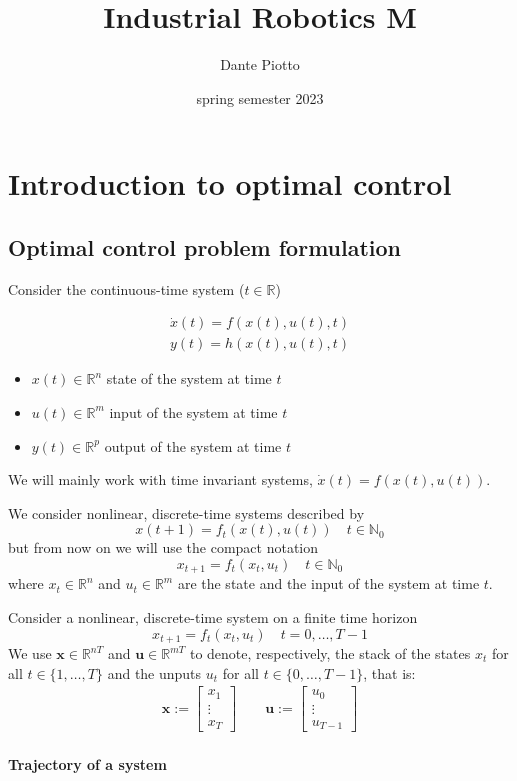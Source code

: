 \documentclass{book}
\title{Industrial Robotics M}
\author{Dante Piotto}
\date{spring semester 2023}
\newcommand{\R}{\mathbb{R}}
\newcommand{\N}{\mathbb{N}}
\begin{document}
\chapter{Introduction to optimal control}

\section{Optimal control problem formulation}
Consider the continuous-time system ($t\in\R$)

\begin{gather}
    \dot{x}(t) = f(x(t),u(t),t) \\
    y(t) = h(x(t),u(t),t)
\end{gather}
\begin{itemize}
    \item $x(t)\in\R^n$ state of the system at time $t$ 
    \item $u(t)\in\R^m$ input of the system at time $t$ 
    \item $y(t)\in\R^p$ output of the system at time $t$
\end{itemize}
We will mainly work with time invariant systems, $\dot{x}(t)=f(x(t),u(t))$. 

We consider nonlinear, discrete-time systems described by 
\[
    x(t+1)=f_t(x(t),u(t)) \quad t\in\N_0
\]
but from now on we will use the compact notation
\[
    x_{t+1}=f_t(x_t,u_t) \quad t\in\N_0
\]
where $x_t\in\R^n$ and $u_t\in\R^m$ are the state and the input of the system at time $t$.

Consider a nonlinear, discrete-time system on a finite time horizon 
\[
    x_{t+1} = f_t(x_t,u_t) \quad t=0,\dots,T-1
\]
We use $\mathbf{x}\in\R^{nT}$ and $\mathbf{u}\in\R^{mT}$ to denote, respectively, the stack of the states $x_t$ for all $t\in\{1,\dots,T\}$ and the unputs $u_t$ for all $t\in\{0,\dots,T-1\}$, that is:
\begin{gather*}
    \mathbf{x} := \begin{bmatrix}
        x_1 \\ \vdots \\ x_T
    \end{bmatrix} \qquad
    \mathbf{u} := \begin{bmatrix}
        u_0 \\ \vdots \\ u_{T-1}
    \end{bmatrix}
\end{gather*}

\subsubsection{Trajectory of a system}
\end{document}
